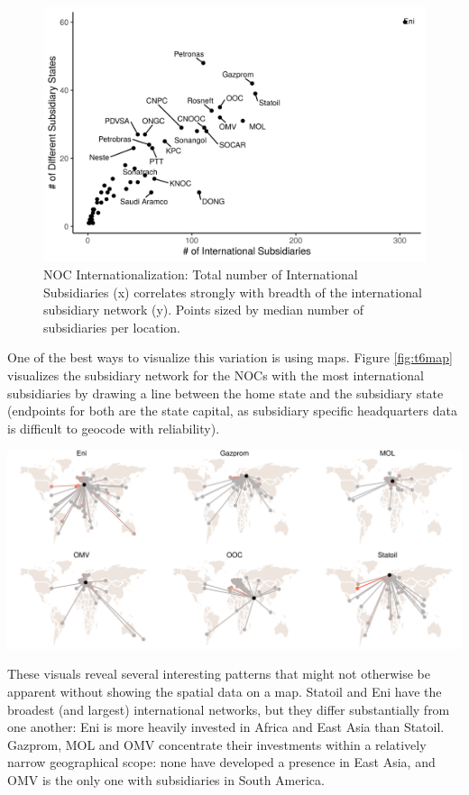 \documentclass[11pt,]{book}
\begin{document}
\begin{figure}

{\centering \includegraphics[width=0.8\linewidth]{finalfig/scatter01-1} 

}

\caption{NOC Internationalization: Total number of International Subsidiaries (x) correlates strongly with breadth of the international subsidiary network (y). Points sized by median number of subsidiaries per location.}\label{fig:scatter01}
\end{figure}

One of the best ways to visualize this variation is using maps. Figure \ref{fig:t6map} visualizes the subsidiary network for the NOCs with the most international subsidiaries by drawing a line between the home state and the subsidiary state (endpoints for both are the state capital, as subsidiary specific headquarters data is difficult to geocode with reliability).

\begin{center}\includegraphics{finalfig/t6map-1} \end{center}

These visuals reveal several interesting patterns that might not otherwise be apparent without showing the spatial data on a map. Statoil and Eni have the broadest (and largest) international networks, but they differ substantially from one another: Eni is more heavily invested in Africa and East Asia than Statoil. Gazprom, MOL and OMV concentrate their investments within a relatively narrow geographical scope: none have developed a presence in East Asia, and OMV is the only one with subsidiaries in South America.
\end{document}
